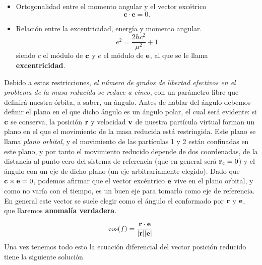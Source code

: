 \begin{itemize}
	\item Ortogonalidad entre el momento angular y el vector excétrico
	      \begin{equation}
		      \mathbf{c} \cdot \mathbf{e} = 0.
	      \end{equation}

	\item Relación entre la excentricidad, energía y momento angular.
	      \begin{equation}
		      e^2 = \frac{2hc^2}{\mu^2} + 1
	      \end{equation}
	      siendo $c$ el módulo de $\mathbf{c}$ y $e$ el módulo de $\mathbf{e}$, al que se le llama \textbf{excentricidad}.
\end{itemize}
Debido a estas restricciones, \textit{el número de grados de libertad efectivos en el problema de la masa reducida se reduce a cinco}, con un parámetro libre que definirá nuestra órbita, a saber, un ángulo. Antes de hablar del ángulo debemos definir el plano en el que dicho ángulo es un ángulo polar, el cual será evidente: si $\mathbf{c}$ se conserva, la posición $\mathbf{r}$ y velocidad $\mathbf{v}$ de nuestra partícula virtual forman un plano en el que el movimiento de la masa reducida está restringida. Este plano se llama \textit{plano orbital}, y el movimiento de las partículas 1 y 2 están confinadas en este plano, y por tanto el movimiento reducido depende de dos coordenadas, de la distancia al punto cero del sistema de referencia (que en general será $\mathbf{r}_c=0$) y el ángulo con un eje de dicho plano (un eje arbitrariamente elegido). Dado que $\mathbf{c} \times \mathbf{e} = 0$, podemos afirmar que el vector excéntrico $\mathbf{e}$ vive en el plano orbital, y como no varía con el tiempo, es un buen eje para tomarlo como eje de referencia. En general este vector se suele elegir como el ángulo el conformado por $\mathbf{r}$ y $\mathbf{e}$, que llaremos \textbf{anomalía verdadera}.

\begin{equation}
	\cos (f) = \frac{\mathbf{r} \cdot \mathbf{e}}{|\mathbf{r}||\mathbf{e}|}
\end{equation}
Una vez tenemos todo esto la ecuación diferencial del vector posición reducido tiene la siguiente solución


